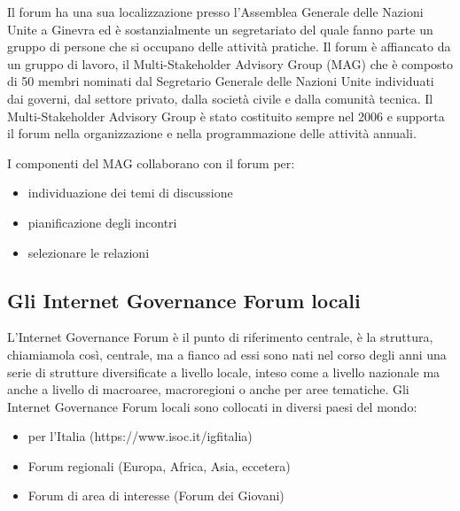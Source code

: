 Il forum ha una sua localizzazione presso l'Assemblea Generale delle Nazioni Unite a Ginevra ed è sostanzialmente un segretariato del quale fanno parte un gruppo di persone che si occupano delle attività pratiche. Il forum è affiancato da un gruppo di lavoro, il Multi-Stakeholder Advisory Group (MAG) che è composto di 50 membri nominati dal Segretario Generale delle Nazioni Unite individuati dai governi, dal settore privato, dalla società civile e dalla comunità tecnica. Il Multi-Stakeholder Advisory Group è stato costituito sempre nel 2006 e supporta il forum nella organizzazione e nella programmazione delle attività annuali.\par
I componenti del MAG collaborano con il forum per:
\begin{itemize}
    \item individuazione dei temi di discussione 
    \item pianificazione degli incontri 
    \item selezionare le relazioni 
\end{itemize}

\subsection{Gli Internet Governance Forum locali}

 L'Internet Governance Forum è il punto di riferimento centrale, è la struttura, chiamiamola così, centrale, ma a fianco ad essi sono nati nel corso degli anni una serie di strutture diversificate a livello locale, inteso come a livello nazionale ma anche a livello di macroaree, macroregioni o anche per aree tematiche. Gli Internet Governance Forum locali sono collocati in diversi paesi del mondo:
 \begin{itemize}
     \item per l'Italia  (https://www.isoc.it/igfitalia)
     \item Forum regionali (Europa, Africa, Asia, eccetera)
     \item Forum di area di interesse (Forum dei Giovani)
 \end{itemize}
 
